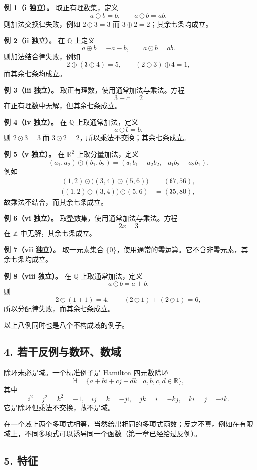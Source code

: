 \textbf{例 1（i 独立）。} 取正有理数集，定义
\[
a\oplus b=b,\qquad a\odot b=ab.
\]
则加法交换律失败，例如 $2\oplus3=3$ 而 $3\oplus2=2$；其余七条均成立。

\textbf{例 2（ii 独立）。} 在 $\mathbb Q$ 上定义
\[
a\oplus b=-a-b,\qquad a\odot b=ab.
\]
则加法结合律失败，例如
\[
2\oplus(3\oplus4)=5,
\qquad
(2\oplus3)\oplus4=1,
\]
而其余七条均成立。

\textbf{例 3（iii 独立）。} 取正有理数，使用通常加法与乘法。方程
\[
3+x=2
\]
在正有理数中无解，但其余七条成立。

\textbf{例 4（iv 独立）。} 在 $\mathbb Q$ 上取通常加法，定义
\[
a\odot b=b.
\]
则 $2\odot3=3$ 而 $3\odot2=2$，所以乘法不交换；其余七条成立。

\textbf{例 5（v 独立）。} 在 $\mathbb R^2$ 上取分量加法，定义
\[
(a_1,a_2)\odot(b_1,b_2)
=(a_1b_1-a_2b_2,-a_1b_2-a_2b_1).
\]
例如
\begin{align*}
(1,2)\odot\bigl((3,4)\odot(5,6)\bigr)&=(67,56),\\
\bigl((1,2)\odot(3,4)\bigr)\odot(5,6)&=(35,80),
\end{align*}
故乘法不结合，而其余七条成立。

\textbf{例 6（vi 独立）。} 取整数集，使用通常加法与乘法。方程
\[
2x=3
\]
在 $\mathbb Z$ 中无解，其余七条成立。

\textbf{例 7（vii 独立）。} 取一元素集合 $\{0\}$，使用通常的零运算。它不含非零元素，其余七条均成立。

\textbf{例 8（viii 独立）。} 在 $\mathbb Q$ 上取通常加法，定义
\[
a\odot b=a+b.
\]
则
\[
2\odot(1+1)=4,
\qquad
(2\odot1)+(2\odot1)=6,
\]
所以分配律失败，而其余七条成立。

以上八例同时也是八个不构成域的例子。

\subsection*{4. 若干反例与数环、数域}

除环未必是域。一个标准例子是 Hamilton 四元数除环
\[
\mathbb H=\{a+bi+cj+dk\mid a,b,c,d\in\mathbb R\},
\]
其中
\[
i^2=j^2=k^2=-1,
\quad ij=k=-ji,
\quad jk=i=-kj,
\quad ki=j=-ik.
\]
它是除环但乘法不交换，故不是域。

在一个域上两个多项式相等，当然给出相同的多项式函数；反之不真。例如在有限域上，不同多项式可以诱导同一个函数（第一章已经给过反例）。

\subsection*{5. 特征}

